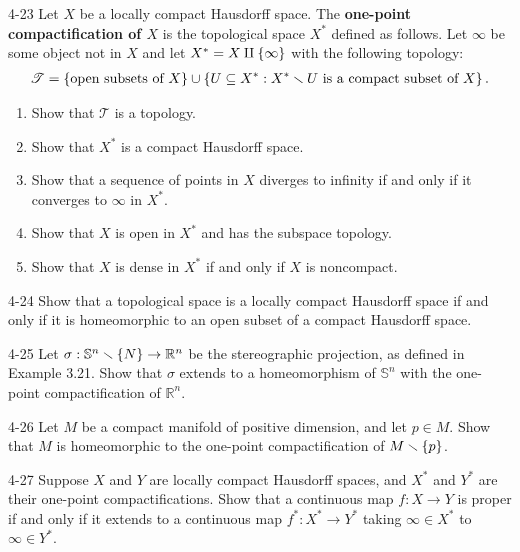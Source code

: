 \begin{problem}{4-23}
Let $X$ be a locally compact Hausdorff space. The \textbf{one-point compactification of $X$} is the topological space $X^{*}$ defined as follows. Let $\infty$ be some object not in $X$ and let $X^{*} = X \amalg \left\{{\infty}\right\}$ with the following topology:
\begin{align*}
	\mathscr{T} = \left\{{\text{open subsets of $X$}}\right\} \cup \left\{{ U \subseteq X^{*} : X^{*} \smallsetminus U \text{ is a compact subset of $X$} }\right\}.
\end{align*}
\begin{enumerate}[label={(\alph*)}]
	\item Show that $\mathscr{T}$ is a topology.
	\item Show that $X^{*}$ is a compact Hausdorff space.
	\item Show that a sequence of points in $X$ diverges to infinity if and only if it converges to $\infty$ in $X^{*}$.
	\item Show that $X$ is open in $X^{*}$ and has the subspace topology.
	\item Show that $X$ is dense in $X^{*}$ if and only if $X$ is noncompact.
\end{enumerate}
\end{problem}

\begin{problem}{4-24}
Show that a topological space is a locally compact Hausdorff space if and only if it is homeomorphic to an open subset of a compact Hausdorff space.
\end{problem}

\begin{problem}{4-25}
Let $\sigma: \mathbb{S}^{n}\smallsetminus\left\{{N}\right\} \to \mathbb{R}^{n}$ be the stereographic projection, as defined in Example 3.21. Show that $\sigma$ extends to a homeomorphism of $\mathbb{S}^{n}$ with the one-point compactification of $\mathbb{R}^{n}$.
\end{problem}

\begin{problem}{4-26}
Let $M$ be a compact manifold of positive dimension, and let $p\in M$. Show that $M$ is homeomorphic to the one-point compactification of $M\smallsetminus \left\{{p}\right\}$.
\end{problem}

\begin{problem}{4-27}
Suppose $X$ and $Y$ are locally compact Hausdorff spaces, and $X^{*}$ and $Y^{*}$ are their one-point compactifications. Show that a continuous map $f: X\to Y$ is proper if and only if it extends to a continuous map $f^{*}: X^{*} \to Y^{*}$ taking $\infty \in X^{*}$ to $\infty \in Y^{*}$.
\end{problem}
